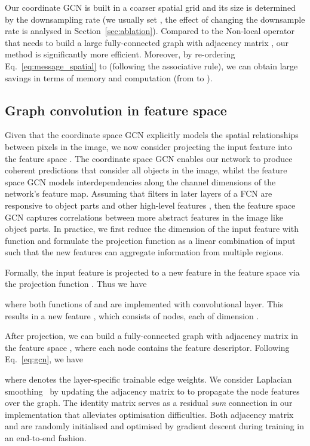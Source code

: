 \documentclass{bmvc2k}
\begin{document}
Our coordinate GCN is built in a coarser spatial grid and its size is determined by the downsampling rate  (we usually set , the effect of changing the downsample rate is analysed in Section~\ref{sec:ablation}).
Compared to the Non-local operator~\cite{Nonlocal} that needs to build a large fully-connected graph with adjacency matrix , our method is significantly more efficient.
Moreover, by re-ordering Eq.~\ref{eq:message_spatial} to  (following the associative rule), we can obtain large savings in terms of memory and computation (from  to ).

\subsection{Graph convolution in feature space}
\label{sec:method_feature_space}
Given that the coordinate space GCN explicitly models the spatial relationships between pixels in the image, we now consider projecting the input feature into the feature space .
The coordinate space GCN enables our network to produce coherent predictions that consider all objects in the image, whilst the feature space GCN models interdependencies along the channel dimensions of the network's feature map.
Assuming that filters in later layers of a FCN are responsive to object parts and other high-level features \cite{zeiler2014visualizing}, then the feature space GCN captures correlations between more abstract features in the image like object parts.
In practice, we first reduce the dimension of the input feature  with function  and formulate the projection function  as a linear combination of input  such that the new features can aggregate information from multiple regions.

Formally, the input feature  is projected to a new feature  in the feature space  via the projection function . 
Thus we have

where both functions of  and  are implemented with  convolutional layer. 
This results in a new feature , which consists of  nodes, each of dimension .

After projection, we can build a fully-connected graph with adjacency matrix  in the feature space , where each node contains the feature descriptor.
Following Eq.~\ref{eq:gcn}, we have

where  denotes the layer-specific trainable edge weights. 
We consider Laplacian smoothing~\cite{li2018deeper, graph_reason} 
by updating the adjacency matrix to  to propagate the node features over the graph. 
The identity matrix  serves as a residual \emph{sum} connection in our implementation that alleviates optimisation difficulties. 
Both adjacency matrix  and  are randomly initialised and optimised by gradient descent during training in an end-to-end fashion.
\end{document}
